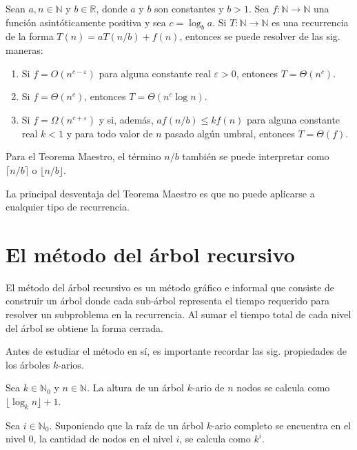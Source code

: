 \begin{thm}
    Sean $a,n\in\mathbb{N}$ y $b\in\mathbb{R}$, donde $a$ y $b$ son
    constantes y $b>1$. Sea $f:\mathbb{N}\to\mathbb{N}$ una función
    asintóticamente positiva y sea $c=\log_{b}a$. Si $T:\mathbb{N}\to\mathbb{N}$
    es una recurrencia de la forma $T(n)=aT(n/b)+f(n)$, entonces se puede
    resolver de las sig. maneras:
    \begin{enumerate}
        \item Si $f=O(n^{c-\varepsilon})$ para alguna constante real $\varepsilon>0$,
        entonces $T=\Theta(n^{c})$.
        \item Si $f=\Theta(n^{c})$, entonces $T=\Theta(n^{c}\log n)$.
        \item Si $f=\Omega(n^{c+\varepsilon})$ y si, además, $af(n/b)\leq kf(n)$
        para alguna constante real $k<1$ y para todo valor de $n$ pasado
        algún umbral, entonces $T=\Theta(f)$.
    \end{enumerate}
\end{thm}

\begin{rem}
    Para el Teorema Maestro, el término $n/b$ también se puede interpretar
    como $\lceil n/b\rceil$ o $\lfloor n/b\rfloor$.
\end{rem}

La principal desventaja del Teorema Maestro es que no puede aplicarse
a cualquier tipo de recurrencia.

\section{El método del árbol recursivo}

El método del árbol recursivo es un método gráfico e informal que
consiste de construir un árbol donde cada sub-árbol representa el
tiempo requerido para resolver un subproblema en la recurrencia. Al
sumar el tiempo total de cada nivel del árbol se obtiene la forma
cerrada. 

Antes de estudiar el método en sí, es importante recordar las sig.
propiedades de los árboles $k$-arios.

\begin{prop}
    Sea $k\in\mathbb{N}_{0}$ y $n\in\mathbb{N}$. La altura de un árbol
    $k$-ario de $n$ nodos se calcula como $\lfloor\log_{k}n\rfloor+1$.
\end{prop}

\begin{prop}
    Sea $i\in\mathbb{N}_{0}$. Suponiendo que la raíz de un árbol $k$-ario
    completo se encuentra en el nivel 0, la cantidad de nodos en el nivel
    $i$, se calcula como $k^{i}$.
\end{prop}


